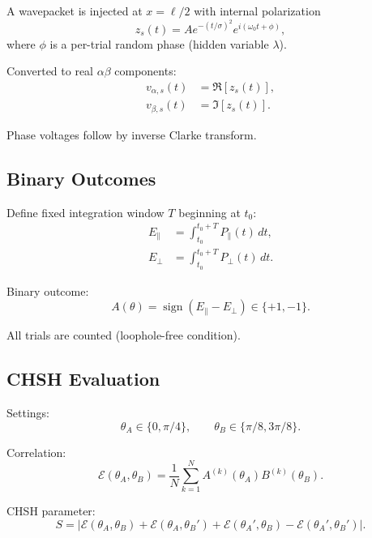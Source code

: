 A wavepacket is injected at $x=\ell/2$ with internal polarization
\begin{equation}
z_s(t) = A e^{-(t/\sigma)^2} e^{i(\omega_0 t + \phi)},
\end{equation}
where $\phi$ is a per-trial random phase (hidden variable $\lambda$).

Converted to real $\alpha\beta$ components:
\begin{align}
v_{\alpha,s}(t) &= \Re[z_s(t)], \\
v_{\beta,s}(t) &= \Im[z_s(t)].
\end{align}

Phase voltages follow by inverse Clarke transform.

\subsection{Binary Outcomes}

Define fixed integration window $T$ beginning at $t_0$:
\begin{align}
E_\parallel &= \int_{t_0}^{t_0+T} P_\parallel(t)\, dt, \\
E_\perp &= \int_{t_0}^{t_0+T} P_\perp(t)\, dt.
\end{align}

Binary outcome:
\begin{equation}
A(\theta) = \operatorname{sign}(E_\parallel - E_\perp) \in \{+1,-1\}.
\end{equation}

All trials are counted (loophole-free condition).

\subsection{CHSH Evaluation}

Settings:
\begin{equation}
\theta_A \in \{0,\pi/4\}, \qquad
\theta_B \in \{\pi/8, 3\pi/8\}.
\end{equation}

Correlation:
\begin{equation}
\mathcal E(\theta_A,\theta_B)
=
\frac{1}{N}\sum_{k=1}^N
A^{(k)}(\theta_A) B^{(k)}(\theta_B).
\end{equation}

CHSH parameter:
\begin{equation}
S =
\left|
\mathcal E(\theta_A,\theta_B)
+
\mathcal E(\theta_A,\theta_B')
+
\mathcal E(\theta_A',\theta_B)
-
\mathcal E(\theta_A',\theta_B')
\right|.
\end{equation}

